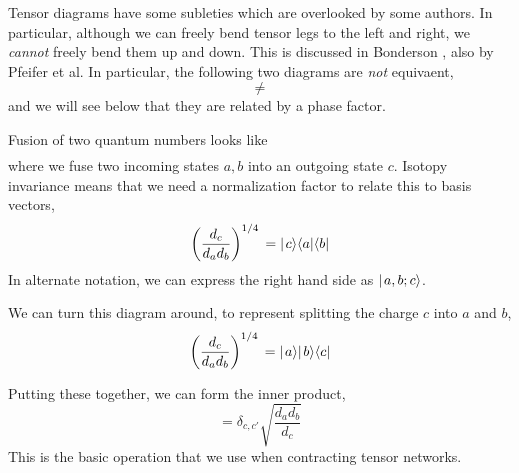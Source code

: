\documentclass[12pt]{article}
\begin{document}
Tensor diagrams have some subleties which are overlooked by some authors. In particular, although
we can freely bend tensor legs to the left and right, we \emph{cannot} freely bend them up and down.
This is discussed in Bonderson \cite{Bonderson}, also by Pfeifer et al\cite{AnyonDMRG}.
In particular, the following two diagrams are \emph{not} equivaent,
\begin{equation}
\begin{gathered}

\end{gathered}
\neq
\begin{gathered}

\end{gathered}
\label{eq:TwistedTime}
\end{equation}
and we will see below that they are related by a phase factor.

Fusion of two quantum numbers looks like
\begin{equation}
\begin{gathered}

\end{gathered}
\end{equation}
where we fuse two incoming states $a,b$ into an outgoing state $c$. 
Isotopy invariance means that we need a normalization factor to relate this to basis vectors,
\begin{equation}
\left(\frac{d_c}{d_a d_b} \right)^{1/4}
\begin{gathered}

\end{gathered}
= \ket{c} \bra{a}\bra{b}
\end{equation}
In alternate notation, we can express the right hand side as $\hbox{$\mid \! {a,b;c} \rangle$}$.

We can turn this diagram around, to represent splitting the charge $c$ into $a$ and $b$,
\begin{equation}
\left(\frac{d_c}{d_a d_b} \right)^{1/4}
\begin{gathered}

\end{gathered}
= \ket{a}\ket{b} \bra{c}
\end{equation}

Putting these together, we can form the inner product,
\begin{equation}
\begin{gathered}

\end{gathered}
= \delta_{c,c'} \sqrt{\frac{d_a d_b}{d_c}}
\begin{gathered}

\end{gathered}
\end{equation}
This is the basic operation that we use when contracting tensor networks.
\end{document}

